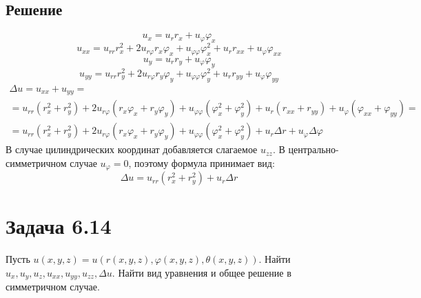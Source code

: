 \documentclass[11pt]{article}
\newcounter{th}\setcounter{th}{0}
\begin{document}
\subsection{Решение}
\label{sec:org37d0874}
$$u_x = u_rr_x + u_{\varphi}\varphi_x$$
$$u_{xx} = u_{rr}r_x^2 + 2u_{r\varphi}r_x\varphi_x + u_{\varphi\varphi}\varphi_x^2 + u_rr_{xx} + u_{\varphi}\varphi_{xx}$$
$$u_y = u_rr_y + u_{\varphi}\varphi_y$$
$$u_{yy} = u_{rr}r_y^2 + 2u_{r\varphi}r_y\varphi_y + u_{\varphi\varphi}\varphi_y^2 + u_rr_{yy} + u_{\varphi}\varphi_{yy}$$
\begin{multline}
\Delta u = u_{xx} + u_{yy} = \\
= u_{rr}(r_x^2 + r_y^2) + 2u_{r\varphi}(r_x\varphi_x + r_y\varphi_y) +
u_{\varphi\varphi}(\varphi_x^2 + \varphi_y^2) + u_r(r_{xx} + r_{yy}) + u_{\varphi}(\varphi_{xx} + \varphi_{yy}) = \\
= u_{rr}(r_x^2 + r_y^2) + 2u_{r\varphi}(r_x\varphi_x + r_y\varphi_y) + u_{\varphi\varphi}(\varphi_x^2 + \varphi_y^2)
+ u_r\Delta r + u_{\varphi}\Delta\varphi
\end{multline}
В случае цилиндрических координат добавляется слагаемое $u_{zz}$. В центрально-симметричном
случае $u_{\varphi} = 0$, поэтому формула принимает вид:
\begin{equation}
\Delta u = u_{rr}(r_x^2 + r_y^2) + u_r\Delta r
\end{equation}
\section{Задача 6.14}
\label{sec:orgde4d1d4}
Пусть $u(x, y, z) = u(r(x, y, z), \varphi(x, y, z), \theta(x, y, z))$. Найти $u_x, u_y, u_z,
u_{xx}, u_{yy}, u_{zz}, \Delta u$. Найти вид уравнения и общее решение в симметричном случае.
\end{document}
